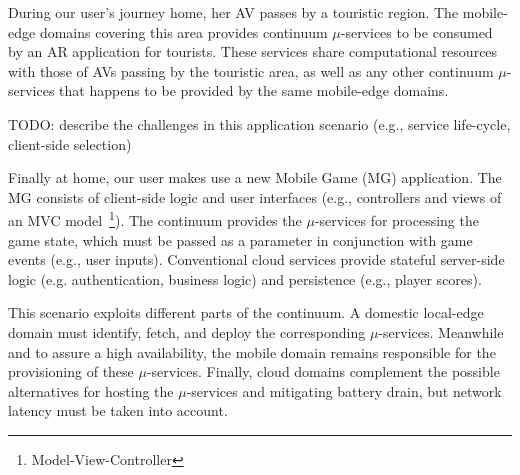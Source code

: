 
During our user's journey home, her AV passes by a touristic region. The mobile-edge domains covering this area provides continuum $\mu$-services to be consumed by an AR application for tourists. These services share computational resources with those of AVs passing by the touristic area, as well as any other continuum $\mu$-services that happens to be provided by the same mobile-edge domains.

TODO: describe the challenges in this application scenario (e.g., service life-cycle, client-side selection)

Finally at home, our user 
makes use a new Mobile Game (MG) application. The MG consists of client-side logic and user interfaces (e.g., controllers and views of an MVC model~\footnote{Model-View-Controller}). The continuum provides the $\mu$-services for processing the game state, which must be passed as a parameter in conjunction with game events (e.g., user inputs). Conventional cloud services provide stateful server-side logic (e.g. authentication, business logic) and persistence (e.g., player scores). 

This scenario exploits different parts of the continuum. A domestic local-edge domain must identify, fetch, and deploy the corresponding $\mu$-services. Meanwhile and to assure a high availability, the mobile domain remains responsible for the provisioning of these $\mu$-services. Finally, cloud domains complement the possible alternatives for hosting the $\mu$-services and mitigating battery drain, but network latency must be taken into account.







